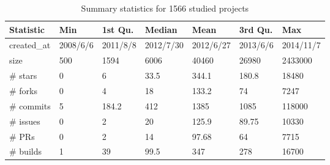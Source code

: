 


\begin{table}[]
	\centering
	\caption{Summary statistics for 1566 studied projects}
	\label{projs_summary}
	\begin{tabular}{ p{1.2cm} p{0.7cm} p{0.7cm} p{0.7cm} p{0.7cm} p{0.7cm} p{0.7cm}}
		\hline
		Statistic       & Min            & 1st Qu.        & Median          & Mean           & 3rd Qu.        & Max             \\ \hline
		
		created\_at     & 2008/6/6 & 2011/8/8  & 2012/7/30 & 2012/6/27 & 2013/6/6  & 2014/11/7 \\
		size            & 500            & 1594           & 6006            & 40460          & 26980          & 2433000         \\
		
		\# stars        & 0              & 6              & 33.5            & 344.1          & 180.8          & 18480           \\
		\# forks        & 0              & 4              & 18              & 133.2          & 74             & 7247            \\
		
		\# commits      & 5              & 184.2          & 412             & 1385           & 1085           & 118000          \\
		\# issues       & 0              & 2              & 20              & 125.9          & 89.75          & 10330           \\
		
		\# PRs & 0              & 2              & 14              & 97.68          & 64             & 7715            \\
		\# builds       & 1              & 39             & 99.5            & 347            & 278            & 16700          
	\end{tabular}
\end{table}
